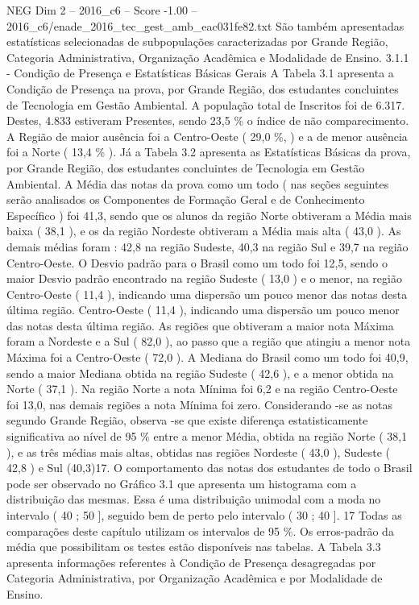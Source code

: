 \begin{textsample}{NEG Dim 2 – 2016\_c6 – Score -1.00 – 2016\_c6/enade\_2016\_tec\_gest\_amb\_eac031fe82.txt}
São também apresentadas estatísticas selecionadas de subpopulações caracterizadas por Grande Região, Categoria Administrativa, Organização Acadêmica e Modalidade de Ensino. 3.1.1 - Condição de Presença e Estatísticas Básicas Gerais A Tabela 3.1 apresenta a Condição de Presença na prova, por Grande Região, dos estudantes concluintes de Tecnologia em Gestão Ambiental.
A população total de Inscritos foi de 6.317.
Destes, 4.833 estiveram Presentes, sendo 23,5 \% o índice de não comparecimento.
A Região de maior ausência foi a Centro-Oeste ( 29,0 \%, ) e a de menor ausência foi a Norte ( 13,4 \% ).
Já a Tabela 3.2 apresenta as Estatísticas Básicas da prova, por Grande Região, dos estudantes concluintes de Tecnologia em Gestão Ambiental.
A Média das notas da prova como um todo ( nas seções seguintes serão analisados os Componentes de Formação Geral e de Conhecimento Específico ) foi 41,3, sendo que os alunos da região Norte obtiveram a Média mais baixa ( 38,1 ), e os da região Nordeste obtiveram a Média mais alta ( 43,0 ).
As demais médias foram : 42,8 na região Sudeste, 40,3 na região Sul e 39,7 na região Centro-Oeste.
O Desvio padrão para o Brasil como um todo foi 12,5, sendo o maior Desvio padrão encontrado na região Sudeste ( 13,0 ) e o menor, na região Centro-Oeste ( 11,4 ), indicando uma dispersão um pouco menor das notas desta última região.
Centro-Oeste ( 11,4 ), indicando uma dispersão um pouco menor das notas desta última região.
As regiões que obtiveram a maior nota Máxima foram a Nordeste e a Sul ( 82,0 ), ao passo que a região que atingiu a menor nota Máxima foi a Centro-Oeste ( 72,0 ).
A Mediana do Brasil como um todo foi 40,9, sendo a maior Mediana obtida na região Sudeste ( 42,6 ), e a menor obtida na Norte ( 37,1 ).
Na região Norte a nota Mínima foi 6,2 e na região Centro-Oeste foi 13,0, nas demais regiões a nota Mínima foi zero.
Considerando -se as notas segundo Grande Região, observa -se que existe diferença estatisticamente significativa ao nível de 95 \% entre a menor Média, obtida na região Norte ( 38,1 ), e as três médias mais altas, obtidas nas regiões Nordeste ( 43,0 ), Sudeste ( 42,8 ) e Sul (40,3)17.
O comportamento das notas dos estudantes de todo o Brasil pode ser observado no Gráfico 3.1 que apresenta um histograma com a distribuição das mesmas.
Essa é uma distribuição unimodal com a moda no intervalo ( 40 ; 50 ], seguido bem de perto pelo intervalo ( 30 ; 40 ]. 17 Todas as comparações deste capítulo utilizam os intervalos de 95 \%.
Os erros-padrão da média que possibilitam os testes estão disponíveis nas tabelas.
A Tabela 3.3 apresenta informações referentes à Condição de Presença desagregadas por Categoria Administrativa, por Organização Acadêmica e por Modalidade de Ensino.

\end{textsample}
